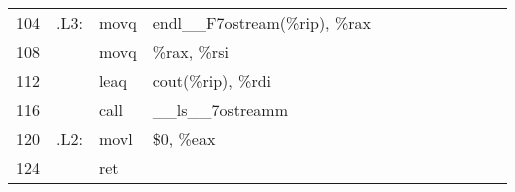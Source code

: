 \documentclass{ti2}
\begin{document}
\begin{minipage}{\linewidth}
{\begin{tabular}{|r|rll||r|rll||r|rll|}
		104 &  .L3: & movq  & endl\_\_F7ostream(\%rip), \%rax &    &            &       &                   &    &             &       &  \\
		108 &       & movq  & \%rax, \%rsi                    &    &            &       &                   &    &             &       &  \\
		112 &       & leaq  & cout(\%rip), \%rdi              &    &            &       &                   &    &             &       &  \\
		116 &       & call  & \_\_ls\_\_7ostreamm             &    &            &       &                   &    &             &       &  \\
		120 &  .L2: & movl  & \$0, \%eax                      &    &            &       &                   &    &             &       &  \\
		124 &       & ret   &                                 &    &            &       &                   &    &             &       &
	\end{tabular}%
	}
\end{minipage}
\end{document}
